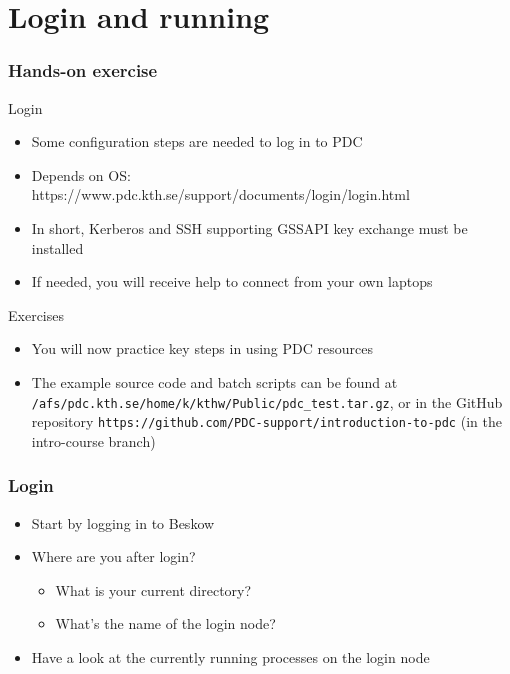 \section*{Login and running}

\begin{frame}[fragile]
  \frametitle{Hands-on exercise}

\footnotesize
\begin{exampleblock}{\large{Login}}
\begin{itemize}
  \item Some configuration steps are needed to log in to PDC 
  \item Depends on OS: https://www.pdc.kth.se/support/documents/login/login.html
  \item In short, Kerberos and SSH supporting GSSAPI key exchange must be installed 
  \item If needed, you will receive help to connect from your own laptops
\end{itemize}
\end{exampleblock}

\begin{exampleblock}{\large{Exercises}}
\begin{itemize}
  \item You will now practice key steps in using PDC resources
  \item The example source code and batch scripts can be found at \verb|/afs/pdc.kth.se/home/k/kthw/Public/pdc_test.tar.gz|,
    or in the GitHub repository \verb|https://github.com/PDC-support/introduction-to-pdc| (in the intro-course branch)
\end{itemize}
\end{exampleblock}

\end{frame}


\begin{frame}[fragile]
  \frametitle{Login}
\begin{itemize}
  \item Start by logging in to Beskow
  \item Where are you after login?
    \begin{itemize}
      \item What is your current directory?
      \item What's the name of the login node?
    \end{itemize}
  \item Have a look at the currently running processes on the login node
\end{itemize}
\end{frame}


